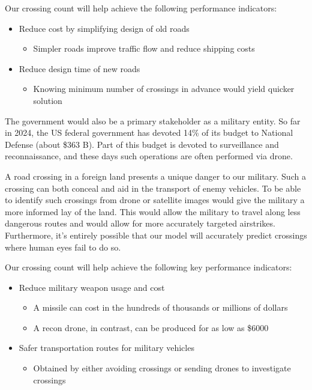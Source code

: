 \documentclass{article}
\begin{document}
	Our crossing count will help achieve the following performance indicators:
	
	\begin{itemize}
		\item Reduce cost by simplifying design of old roads
		\begin{itemize}
			\item Simpler roads improve traffic flow and reduce shipping costs
			\end{itemize}
		\item Reduce design time of new roads
			\begin{itemize}
				\item Knowing minimum number of crossings in advance would yield quicker solution
			\end{itemize}
	\end{itemize}
	The government would also be a primary stakeholder as a military entity. So far in 2024, the US federal government has devoted 14\% of its budget to National Defense (about \$363 B). Part of this budget is devoted to surveillance and reconnaissance, and these days such operations are often performed via drone. 
	
	A road crossing in a foreign land presents a unique danger to our military. Such a crossing can both conceal and aid in the transport of enemy vehicles. To be able to identify such crossings from drone or satellite images would give the military a more informed lay of the land. This would allow the military to travel along less dangerous routes and would allow for more accurately targeted airstrikes. Furthermore, it's entirely possible that our model will accurately predict crossings where human eyes fail to do so. 
	
	Our crossing count will help achieve the following key performance indicators:
	
	\begin{itemize}
		\item Reduce military weapon usage and cost
		\begin{itemize}
			\item A missile can cost in the hundreds of thousands or millions of dollars
			\item A recon drone, in contrast, can be produced for as low as \$6000
		\end{itemize}
		\item Safer transportation routes for military vehicles
			\begin{itemize}
				\item Obtained by either avoiding crossings or sending drones to investigate crossings
			\end{itemize}
		\end{itemize}
		

	
\end{document}
